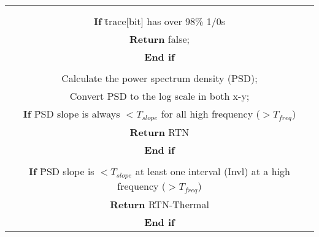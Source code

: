 
\begin{center}

\begin{tabular}{|c|}
\hline
\begin{minipage}[t]{3.2in}



\begin{tabbing}
{\bf Algorithm II  Determine whether there is RTN in a bit }
\\
\\ {\bf If} \= trace[bit] has over 98\% 1/0s
\\ \>        {\bf Return} false;
\\ {\bf End if} 
\\
\\ Calculate the power spectrum density (PSD);
\\ Convert PSD to the log scale in both x-y;

\\ {\bf If} \= PSD slope is always $< T_{slope}$ for all high frequency ($> T_{freq}$)
\\ \> {\bf Return} RTN
\\ {\bf End if} 
\\
\\ {\bf If} \= PSD slope is $< T_{slope}$ at least one interval (Invl) at a high frequency ($> T_{freq}$)
\\ \> {\bf Return} RTN-Thermal
\\ {\bf End if}


\end{tabbing}
\end{minipage}
\\ \hline
\end{tabular}
\end{center}
